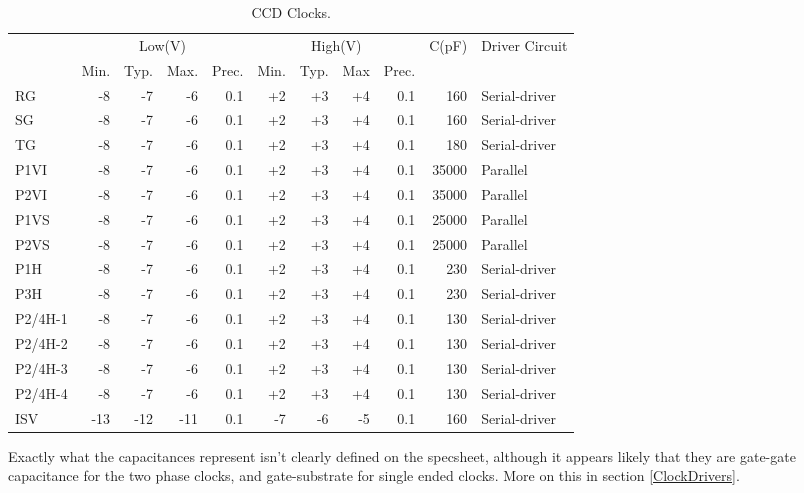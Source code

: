 \begin{table}[h]
\centering
\begin{tabular}{|l|rrrr|rrrr|r|l|}
\hline
&\multicolumn{4}{c|}{Low(V)}&\multicolumn{4}{c|}{High(V)}& C(pF)& Driver Circuit \\ 
&Min.&Typ.&Max.&Prec.&Min.&Typ.&Max&Prec.&& \\
\hline
RG & -8 & -7 & -6 & 0.1 & +2 & +3 & +4 & 0.1 & 160 & Serial-driver \\
SG & -8 & -7 & -6 & 0.1 & +2 & +3 & +4 & 0.1 & 160 & Serial-driver \\
TG & -8 & -7 & -6 & 0.1 & +2 & +3 & +4 & 0.1 & 180 & Serial-driver \\
P1VI & -8 & -7 & -6 & 0.1 & +2 & +3 & +4 & 0.1 & 35000 & Parallel \\
P2VI & -8 & -7 & -6 & 0.1 & +2 & +3 & +4 & 0.1 & 35000 & Parallel \\
P1VS & -8 & -7 & -6 & 0.1 & +2 & +3 & +4 & 0.1 & 25000 & Parallel \\
P2VS & -8 & -7 & -6 & 0.1 & +2 & +3 & +4 & 0.1 & 25000 & Parallel \\
P1H & -8 & -7 & -6 & 0.1 & +2 & +3 & +4 & 0.1 & 230 & Serial-driver \\
P3H & -8 & -7 & -6 & 0.1 & +2 & +3 & +4 & 0.1 & 230 & Serial-driver \\
P2/4H-1 & -8 & -7 & -6 & 0.1 & +2 & +3 & +4 & 0.1 & 130 & Serial-driver \\
P2/4H-2 & -8 & -7 & -6 & 0.1 & +2 & +3 & +4 & 0.1 & 130 & Serial-driver \\
P2/4H-3 & -8 & -7 & -6 & 0.1 & +2 & +3 & +4 & 0.1 & 130 & Serial-driver \\
P2/4H-4 & -8 & -7 & -6 & 0.1 & +2 & +3 & +4 & 0.1 & 130 & Serial-driver \\
ISV & -13 & -12 & -11 & 0.1 & -7 & -6 & -5 & 0.1 &160 & Serial-driver \\
\hline
\end{tabular}
 \caption{CCD Clocks.}
 \label{Clocks}
\end{table}

Exactly what the capacitances represent isn't clearly defined on the specsheet, although it appears likely that they are gate-gate capacitance for the two phase clocks, and gate-substrate for single ended clocks. More on this in section \ref{ClockDrivers}.


